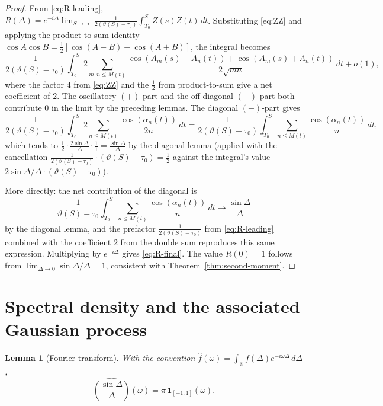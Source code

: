\documentclass[11pt]{article}
\numberwithin{equation}{section}
\theoremstyle{plain}
\newtheorem{lemma}[theorem]{Lemma}
\theoremstyle{definition}
\begin{document}
\begin{proof}
From \eqref{eq:R-leading},
\(R(\Delta)=e^{-i\Delta}\lim_{S\to\infty}\frac{1}{2(\vartheta(S)-\tau_0)}
\int_{T_0}^S Z(s)Z(t)\,dt\).
Substituting \eqref{eq:ZZ} and applying the product-to-sum identity
\(\cos A\cos B=\frac12[\cos(A-B)+\cos(A+B)]\), the integral becomes
\[
\frac{1}{2(\vartheta(S)-\tau_0)}
\int_{T_0}^S
2\sum_{m,n\le M(t)}\frac{\cos(A_m(s)-A_n(t))+\cos(A_m(s)+A_n(t))}{2\sqrt{mn}}
\,dt + o(1),
\]
where the factor \(4\) from \eqref{eq:ZZ} and the \(\frac12\) from product-to-sum
give a net coefficient of \(2\). The oscillatory \((+)\)-part and the off-diagonal
\((-)\)-part both contribute \(0\) in the limit by the preceding lemmas. The diagonal
\((-)\)-part gives
\[
\frac{1}{2(\vartheta(S)-\tau_0)}
\int_{T_0}^S
2\sum_{n\le M(t)}\frac{\cos(\alpha_n(t))}{2n}\,dt
=
\frac{1}{2(\vartheta(S)-\tau_0)}
\int_{T_0}^S
\sum_{n\le M(t)}\frac{\cos(\alpha_n(t))}{n}\,dt,
\]
which tends to \(\frac{1}{2}\cdot\frac{2\sin\Delta}{\Delta}\cdot\frac{1}{1}
=\frac{\sin\Delta}{\Delta}\) by the diagonal lemma (applied with the cancellation
\(\frac{1}{2(\vartheta(S)-\tau_0)}\cdot(\vartheta(S)-\tau_0)=\frac12\) against
the integral's value \(2\sin\Delta/\Delta\cdot(\vartheta(S)-\tau_0)\)).

More directly: the net contribution of the diagonal is
\[
\frac{1}{\vartheta(S)-\tau_0}\int_{T_0}^S\sum_{n\le M(t)}
\frac{\cos(\alpha_n(t))}{n}\,dt\to\frac{\sin\Delta}{\Delta}
\]
by the diagonal lemma, and the prefactor \(\frac{1}{2(\vartheta(S)-\tau_0)}\)
from \eqref{eq:R-leading} combined with the coefficient \(2\) from the double sum
reproduces this same expression. Multiplying by \(e^{-i\Delta}\) gives
\eqref{eq:R-final}. The value \(R(0)=1\) follows from
\(\lim_{\Delta\to0}\sin\Delta/\Delta=1\), consistent with Theorem~\ref{thm:second-moment}.
\end{proof}

\section{Spectral density and the associated Gaussian process}

\begin{lemma}[Fourier transform]
With the convention \(\widehat{f}(\omega)=\int_\mathbb{R} f(\Delta)e^{-i\omega\Delta}\,d\Delta\),
\begin{equation}
\widehat{\left(\frac{\sin\Delta}{\Delta}\right)}(\omega)
=\pi\,\mathbf{1}_{[-1,1]}(\omega).
\label{eq:sinc-ft}
\end{equation}
\end{lemma}
\end{document}
